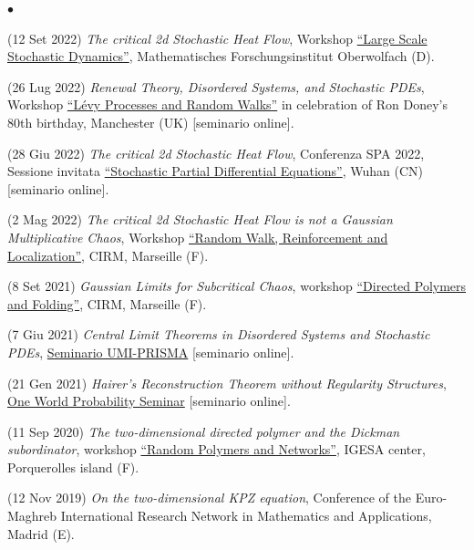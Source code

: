 \documentclass[a4paper,11pt,oneside]{amsart}
\newenvironment{myitemize}{%
\begin{list}{$\bullet$}%
 	{%
	\setlength{\itemsep}{0.3em}%
	\setlength{\topsep}{0.3em}%
	\setlength{\partopsep}{0em}%
	\setlength{\parsep}{0em}%
	\setlength{\parskip}{0em}%
	\setlength\leftmargin{1.5em}%
	\setlength\labelwidth{1.1em}%
	\setlength{\labelsep}{0.4em}%
	}%
	}%
{\end{list}}
\renewenvironment{itemize}{
\begin{myitemize}}%
{\end{myitemize}}
\begin{document}
\begin{itemize}
\item (12 Set 2022)
\emph{The critical 2d Stochastic Heat Flow},
Workshop \href{https://www.mfo.de/occasion/2237/www_view}{``Large Scale Stochastic Dynamics''},
Mathematisches Forschungsinstitut Oberwolfach (D).

\item (26 Lug 2022)
\emph{Renewal Theory, Disordered Systems, and Stochastic PDEs},
Workshop 
\href{https://personalpages.manchester.ac.uk/staff/denis.denisov/LevyRW-workshop/index.html}{``Lévy 
Processes and Random Walks''}
in celebration of Ron Doney's 80th birthday,
Manchester (UK) [seminario online].

\item (28 Giu 2022)
\emph{The critical 2d Stochastic Heat Flow},
Conferenza SPA 2022, Sessione invitata 
\href{https://spa2022.whu.edu.cn/Programme/Invited_sessions.htm}{``Stochastic 
Partial Differential Equations''}, 
Wuhan (CN) [seminario online].

\item (2 Mag 2022)
\emph{The critical 2d Stochastic Heat Flow is not a Gaussian Multiplicative Chaos},
Workshop \href{https://conferences.cirm-math.fr/2799.html}{``Random Walk, 
Reinforcement and Localization''},
CIRM, Marseille (F).

\item (8 Set 2021)
\emph{Gaussian Limits for Subcritical Chaos},
workshop \href{https://conferences.cirm-math.fr/2124.html}{``Directed Polymers and Folding''}, 
CIRM, Marseille (F).

\item (7 Giu 2021)
\emph{Central Limit Theorems in Disordered Systems and Stochastic PDEs},
\href{http://www.umi-prisma.polito.it/webinars.html}{Seminario UMI-PRISMA} [seminario online].

\item (21 Gen 2021)
\emph{Hairer's Reconstruction Theorem without Regularity Structures},
\href{https://www.owprobability.org/one-world-probability-seminar/past-seminars#h.fejiyznu0y15}{One 
World Probability Seminar} [seminario online].

\item (11 Sep 2020)
\emph{The two-dimensional directed polymer 
and the Dickman subordinator},
workshop \href{https://perso.math.u-pem.fr/asselah.amine/PORQ2020.html}{``Random Polymers 
and Networks''}, IGESA center, Porquerolles island (F).

\item (12 Nov 2019)
\emph{On the two-dimensional KPZ equation},
Conference of the Euro-Maghreb 
International Research Network in Mathematics and Applications,
Madrid (E).


\end{itemize}
\end{document}

